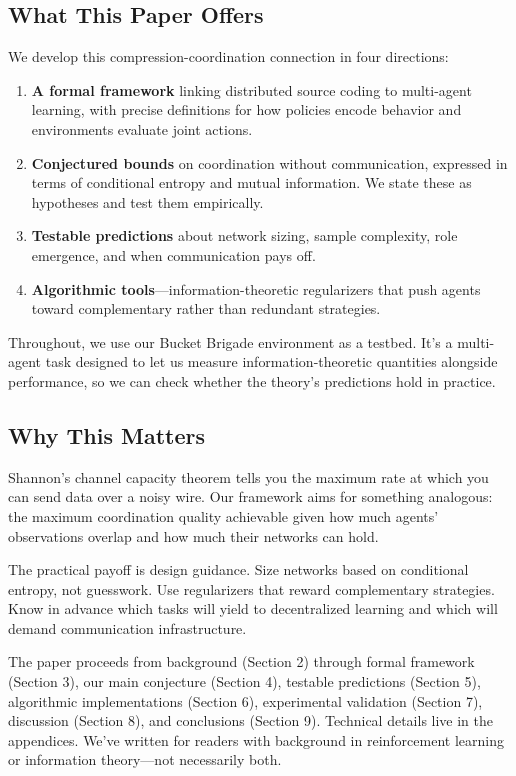 \documentclass[10pt, letterpaper]{article}
\begin{document}
\subsection*{What This Paper Offers}

We develop this compression-coordination connection in four directions:
\begin{enumerate}
    \item \textbf{A formal framework} linking distributed source coding to multi-agent learning, with precise definitions for how policies encode behavior and environments evaluate joint actions.
    \item \textbf{Conjectured bounds} on coordination without communication, expressed in terms of conditional entropy and mutual information. We state these as hypotheses and test them empirically.
    \item \textbf{Testable predictions} about network sizing, sample complexity, role emergence, and when communication pays off.
    \item \textbf{Algorithmic tools}---information-theoretic regularizers that push agents toward complementary rather than redundant strategies.
\end{enumerate}

Throughout, we use our Bucket Brigade environment as a testbed. It's a multi-agent task designed to let us measure information-theoretic quantities alongside performance, so we can check whether the theory's predictions hold in practice.

\subsection*{Why This Matters}

Shannon's channel capacity theorem tells you the maximum rate at which you can send data over a noisy wire. Our framework aims for something analogous: the maximum coordination quality achievable given how much agents' observations overlap and how much their networks can hold.

The practical payoff is design guidance. Size networks based on conditional entropy, not guesswork. Use regularizers that reward complementary strategies. Know in advance which tasks will yield to decentralized learning and which will demand communication infrastructure.

The paper proceeds from background (Section 2) through formal framework (Section 3), our main conjecture (Section 4), testable predictions (Section 5), algorithmic implementations (Section 6), experimental validation (Section 7), discussion (Section 8), and conclusions (Section 9). Technical details live in the appendices. We've written for readers with background in reinforcement learning or information theory---not necessarily both.
\end{document}
